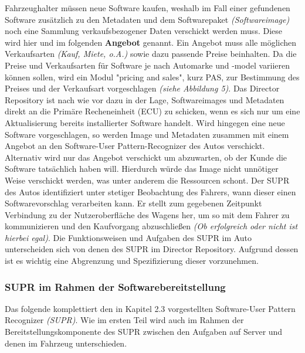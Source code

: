 Fahrzeughalter müssen neue Software kaufen, weshalb im Fall einer gefundenen Software zusätzlich zu den Metadaten und dem Softwarepaket \textit{(Softwareimage)} noch eine Sammlung verkaufsbezogener Daten verschickt werden muss. Diese wird hier und im folgenden \textbf{Angebot} genannt. Ein Angebot muss alle möglichen Verkaufsarten \textit{(Kauf, Miete, o.A.)} sowie dazu passende Preise beinhalten. Da die Preise und Verkaufsarten für Software je nach Automarke und -model variieren können sollen, wird ein Modul "pricing and sales", kurz PAS, zur Bestimmung des Preises und der Verkaufsart vorgeschlagen \textit{(siehe Abbildung 5)}. Das Director Repository ist nach wie vor dazu in der Lage, Softwareimages und Metadaten direkt an die Primäre Recheneinheit (ECU) zu schicken, wenn es sich nur um eine Aktualisierung bereits installierter Software handelt. Wird hingegen eine neue Software vorgeschlagen, so werden Image und Metadaten zusammen mit einem Angebot an den Software-User Pattern-Recognizer des Autos verschickt. Alternativ wird nur das Angebot verschickt um abzuwarten, ob der Kunde die Software tatsächlich haben will. Hierdurch würde das Image nicht unnötiger Weise verschickt werden, was unter anderem die Ressourcen schont. Der SUPR des Autos identifiziert unter stetiger Beobachtung des Fahrers, wann dieser einen Softwarevorschlag verarbeiten kann. Er stellt zum gegebenen Zeitpunkt Verbindung zu der Nutzeroberfläche des Wagens her, um so mit dem Fahrer zu kommunizieren und den Kaufvorgang abzuschließen \textit{(Ob erfolgreich oder nicht ist hierbei egal)}. Die Funktionsweisen und Aufgaben des SUPR im Auto unterscheiden sich von denen des SUPR im Director Repository. Aufgrund dessen ist es wichtig eine Abgrenzung und Spezifizierung dieser vorzunehmen.\\

\subsubsection{SUPR im Rahmen der Softwarebereitstellung}
Das folgende komplettiert den in Kapitel 2.3 vorgestellten Software-User Pattern Recognizer \textit{(SUPR)}. Wie im ersten Teil wird auch im Rahmen der Bereitstellungskomponente des SUPR zwischen den Aufgaben auf Server und denen im Fahrzeug unterschieden.\\

